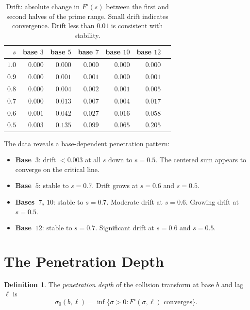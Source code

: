 \documentclass[12pt]{amsart}
\theoremstyle{definition}
\newtheorem{definition}[theorem]{Definition}
\theoremstyle{remark}
\begin{document}
\begin{table}[h]
\centering
\begin{tabular}{rrrrrrr}
\toprule
$s$ & base $3$ & base $5$ & base $7$ & base $10$ & base $12$ \\
\midrule
$1.0$ & $0.000$ & $0.000$ & $0.000$ & $0.000$ & $0.000$ \\
$0.9$ & $0.000$ & $0.001$ & $0.001$ & $0.000$ & $0.001$ \\
$0.8$ & $0.000$ & $0.004$ & $0.002$ & $0.001$ & $0.005$ \\
$0.7$ & $0.000$ & $0.013$ & $0.007$ & $0.004$ & $0.017$ \\
$0.6$ & $0.001$ & $0.042$ & $0.027$ & $0.016$ & $0.058$ \\
$0.5$ & $0.003$ & $0.135$ & $0.099$ & $0.065$ & $0.205$ \\
\bottomrule
\end{tabular}
\caption{Drift: absolute change in $F^{\circ}(s)$ between
the first and second halves of the prime range. Small drift
indicates convergence. Drift less than $0.01$ is consistent
with stability.}
\label{tab:drift}
\end{table}

The data reveals a base-dependent penetration pattern:

\begin{itemize}
\item \textbf{Base~$3$}: drift $< 0.003$ at all $s$ down to
$s = 0.5$. The centered sum appears to converge on the
critical line.

\item \textbf{Base~$5$}: stable to $s = 0.7$. Drift grows at
$s = 0.6$ and $s = 0.5$.

\item \textbf{Bases~$7$, $10$}: stable to $s = 0.7$. Moderate
drift at $s = 0.6$. Growing drift at $s = 0.5$.

\item \textbf{Base~$12$}: stable to $s = 0.7$. Significant
drift at $s = 0.6$ and $s = 0.5$.
\end{itemize}

\section{The Penetration Depth}

\begin{definition}
The \emph{penetration depth} of the collision transform at
base $b$ and lag $\ell$ is
\[
\sigma_0(b, \ell) = \inf\{\sigma > 0 :
F^{\circ}(\sigma, \ell) \text{ converges}\}.
\]
\end{definition}
\end{document}
